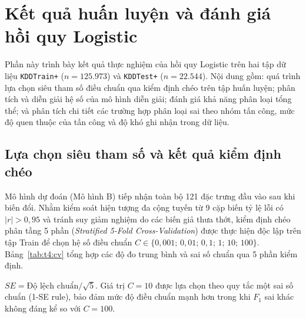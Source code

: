 \section{Kết quả huấn luyện và đánh giá hồi quy Logistic}
\label{sec:t4:result}

Phần này trình bày kết quả thực nghiệm của hồi quy Logistic trên hai tập dữ liệu \texttt{KDDTrain+} ($n=125.973$) và \texttt{KDDTest+} ($n=22.544$). Nội dung gồm: quá trình lựa chọn siêu tham số điều chuẩn qua kiểm định chéo trên tập huấn luyện; phân tích và diễn giải hệ số của mô hình diễn giải; đánh giá khả năng phân loại tổng thể; và phân tích chi tiết các trường hợp phân loại sai theo nhóm tấn công, mức độ quen thuộc của tấn công và độ khó ghi nhận trong dữ liệu.

\subsection{Lựa chọn siêu tham số và kết quả kiểm định chéo}
Mô hình dự đoán (Mô hình B) tiếp nhận toàn bộ 121 đặc trưng đầu vào sau khi biến đổi. Nhằm kiểm soát hiện tượng đa cộng tuyến từ 9 cặp biến tỷ lệ lỗi có $|r|>0{,}95$ và tránh suy giảm nghiệm do các biến giả thưa thớt, kiểm định chéo phân tầng 5 phần (\textit{Stratified 5-Fold Cross-Validation}) được thực hiện độc lập trên tập Train để chọn hệ số điều chuẩn $C\in\{0{,}001;\,0{,}01;\,0{,}1;\,1;\,10;\,100\}$. Bảng~\ref{tab:t4:cv} tổng hợp các độ đo trung bình và sai số chuẩn qua 5 phần kiểm định.

\begin{table}[H]
\centering
\caption{Kết quả kiểm định chéo 5 phần trên tập KDDTrain+ của Mô hình B}
\label{tab:t4:cv}
\small
\setlength{\tabcolsep}{4pt}
\par\smallskip\footnotesize $SE = \text{Độ lệch chuẩn} / \sqrt{5}$. Giá trị $C=10$ được lựa chọn theo quy tắc một sai số chuẩn (1-SE rule), bảo đảm mức độ điều chuẩn mạnh hơn trong khi $F_1$ sai khác không đáng kể so với $C=100$.
\end{table}

